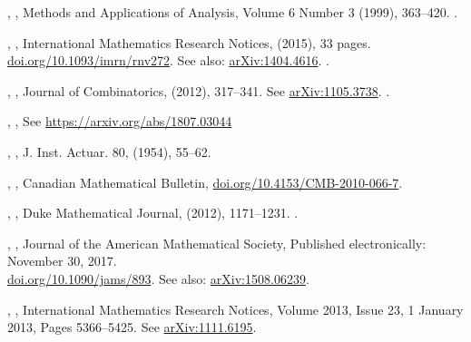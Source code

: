 \documentclass[12pt]{amsart}
\theoremstyle{plain}
\theoremstyle{definition}
\theoremstyle{remark}
\begin{document}
\begin{thebibliography}{10}
,
,
Methods and Applications of Analysis, 
 Volume 6 Number 3 (1999), 363--420. .

,
,
International Mathematics Research Notices, (2015), 33 pages.
\href{https://doi.org/10.1093/imrn/rnv272}{doi.org/10.1093/imrn/rnv272}. See also:
\href{http://arxiv.org/abs/1404.4616}{arXiv:1404.4616}.  .


,
, 
Journal of Combinatorics,  (2012), 317--341. 
See \href{http://arxiv.org/abs/arXiv:1105.3738}{arXiv:1105.3738}. .

,
, 
See \href{https://arxiv.org/abs/1807.03044}{https://arxiv.org/abs/1807.03044}

,
, J. Inst. Actuar. 80, (1954), 55--62.


 ,
,
Canadian Mathematical Bulletin,
\href{https://doi.org/10.4153/CMB-2010-066-7}{doi.org/10.4153/CMB-2010-066-7}. 

,
,
Duke Mathematical Journal,   (2012), 1171--1231. .

,
,
Journal of the American Mathematical Society, Published electronically: November 30, 2017.\\
\href{https://doi.org/10.1090/jams/893}{doi.org/10.1090/jams/893}.
See also: \href{http://arxiv.org/abs/arXiv:1508.06239}{arXiv:1508.06239}.

,
,
International Mathematics Research Notices, Volume 2013, Issue 23, 1 January 2013, Pages 5366--5425.
See \href{https://arxiv.org/abs/1111.6195}{arXiv:1111.6195}.


\end{thebibliography}
\end{document}
